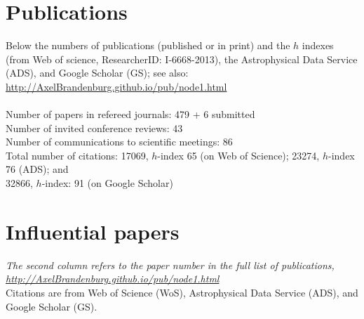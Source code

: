 \documentclass{article}
\begin{document}
\section*{Publications}
Below the numbers of publications (published or in print)
and the $h$ indexes (from Web of science, ResearcherID: I-6668-2013),
the Astrophysical Data Service (ADS), and Google Scholar (GS); see also:\\
\url{http://AxelBrandenburg.github.io/pub/node1.html}\\
\\
Number of papers in refereed journals: 479 + 6 submitted\\
Number of invited conference reviews: 43\\
Number of communications to scientific meetings: 86\\
Total number of citations:
17069, $h$-index 65 (on Web of Science); %
23274, $h$-index 76 (ADS); and \\ %
32866, $h$-index: 91 (on Google Scholar)\\ %

\section*{Influential papers}

{\it
The second column refers to the paper number in the full list of publications,\\
\url{http://AxelBrandenburg.github.io/pub/node1.html}}\\
Citations are from Web of Science (WoS),
Astrophysical Data Service (ADS), and Google Scholar (GS).\\
\vspace{2mm}
\end{document}

